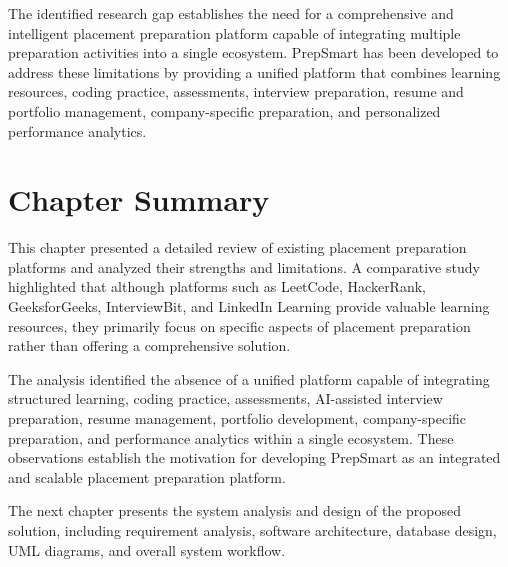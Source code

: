 The identified research gap establishes the need for a comprehensive and intelligent placement preparation platform capable of integrating multiple preparation activities into a single ecosystem. PrepSmart has been developed to address these limitations by providing a unified platform that combines learning resources, coding practice, assessments, interview preparation, resume and portfolio management, company-specific preparation, and personalized performance analytics.

\section{Chapter Summary}

This chapter presented a detailed review of existing placement preparation platforms and analyzed their strengths and limitations. A comparative study highlighted that although platforms such as LeetCode, HackerRank, GeeksforGeeks, InterviewBit, and LinkedIn Learning provide valuable learning resources, they primarily focus on specific aspects of placement preparation rather than offering a comprehensive solution.

The analysis identified the absence of a unified platform capable of integrating structured learning, coding practice, assessments, AI-assisted interview preparation, resume management, portfolio development, company-specific preparation, and performance analytics within a single ecosystem. These observations establish the motivation for developing PrepSmart as an integrated and scalable placement preparation platform.

The next chapter presents the system analysis and design of the proposed solution, including requirement analysis, software architecture, database design, UML diagrams, and overall system workflow.